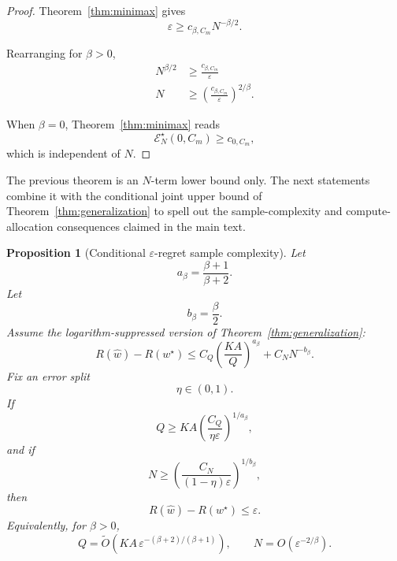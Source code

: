 \documentclass{article} %
\newtheorem{proposition}[theorem]{Proposition}
\providecommand{\Risk}{R}
\providecommand{\what}{\widehat{w}}
\providecommand{\wstar}{w^{\star}}
\begin{document}
\begin{proof}
Theorem~\ref{thm:minimax} gives
\begin{equation}
\label{eq:rollout-proof-a}
\varepsilon
\ge
c_{\beta,C_m}N^{-\beta/2}.
\end{equation}

Rearranging for \(\beta>0\),
\begin{align}
N^{\beta/2}
&\ge
\frac{c_{\beta,C_m}}{\varepsilon}
\label{eq:rollout-proof-b}
\\
N
&\ge
\left(\frac{c_{\beta,C_m}}{\varepsilon}\right)^{2/\beta}.
\label{eq:rollout-proof-c}
\end{align}

When \(\beta=0\), Theorem~\ref{thm:minimax} reads
\begin{equation}
\label{eq:rollout-proof-d}
\mathcal E_N^\star(0,C_m)\ge c_{0,C_m},
\end{equation}
which is independent of \(N\).
\end{proof}

The previous theorem is an \(N\)-term lower bound only.  The next statements
combine it with the conditional joint upper bound of Theorem~\ref{thm:generalization}
to spell out the sample-complexity and compute-allocation consequences claimed
in the main text.

\begin{proposition}[Conditional \(\varepsilon\)-regret sample complexity]
\label{prop:3}
Let
\begin{equation}
\label{eq:prop3-a}
a_\beta=\frac{\beta+1}{\beta+2}.
\end{equation}
Let
\begin{equation}
\label{eq:prop3-b}
b_\beta=\frac{\beta}{2}.
\end{equation}
Assume the logarithm-suppressed version of Theorem~\ref{thm:generalization}:
\begin{equation}
\label{eq:prop3-joint-simplified}
\Risk(\what)-\Risk(\wstar)
\le
C_Q\left(\frac{KA}{Q}\right)^{a_\beta}
+
C_NN^{-b_\beta}.
\end{equation}
Fix an error split
\begin{equation}
\label{eq:prop3-eta}
\eta\in(0,1).
\end{equation}
If
\begin{equation}
\label{eq:prop3-Qneed}
Q
\ge
KA
\left(\frac{C_Q}{\eta\varepsilon}\right)^{1/a_\beta},
\end{equation}
and if
\begin{equation}
\label{eq:prop3-Nneed}
N
\ge
\left(\frac{C_N}{(1-\eta)\varepsilon}\right)^{1/b_\beta},
\end{equation}
then
\begin{equation}
\label{eq:prop3-eps}
\Risk(\what)-\Risk(\wstar)
\le
\varepsilon .
\end{equation}
Equivalently, for \(\beta>0\),
\begin{equation}
\label{eq:prop3-scaling}
Q
=
\widetilde O\!\left(
KA\,\varepsilon^{-(\beta+2)/(\beta+1)}
\right),
\qquad
N
=
O\!\left(
\varepsilon^{-2/\beta}
\right).
\end{equation}
\end{proposition}
\end{document}
